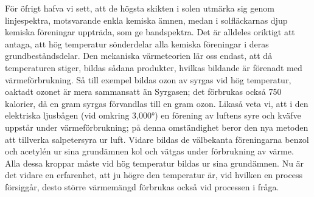 \documentclass[a4paper, 12pt, oneside, swedish]{article}
\begin{document}
För öfrigt hafva vi sett, att de högsta skikten i solen utmärka sig genom linjespektra, motsvarande enkla kemiska ämnen, medan i solfläckarnas djup kemiska föreningar uppträda, som ge bandspektra. Det är alldeles oriktigt att antaga, att hög temperatur sönderdelar alla kemiska föreningar i deras grundbeståndsdelar. Den mekaniska värmeteorien lär oss endast, att då temperaturen stiger, bildas sådana produkter, hvilkas bildande är förenadt med värmeförbrukning. Så till exempel bildas ozon av syrgas vid hög temperatur, oaktadt ozonet är mera sammansatt än Syrgasen; det förbrukas också 750 kalorier, då en gram syrgas förvandlas till en gram ozon. Likaså veta vi, att i den elektriska ljusbågen (vid omkring 3,000°) en förening av luftens syre och kväfve uppstår under värmeförbrukning; på denna omständighet beror den nya metoden att tillverka salpetersyra ur luft. Vidare bildas de välbekanta föreningarna benzol och acetylén ur sina grundämnen kol och vätgas under förbrukning av värme. Alla dessa kroppar måste vid hög temperatur bildas ur sina grundämnen. Nu är det vidare en erfarenhet, att ju högre den temperatur är, vid hvilken en process försiggår, desto större värmemängd förbrukas också vid processen i fråga.
\end{document}
